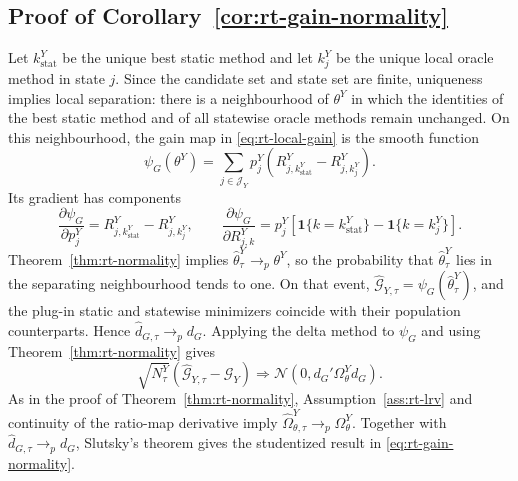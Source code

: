 \documentclass[a4paper, 12pt]{article}
\theoremstyle{plain}
\theoremstyle{remark}
\newcommand{\1}{\mathbf{1}}
\begin{document}
\subsection*{Proof of Corollary~\ref{cor:rt-gain-normality}}
Let \(k^Y_{\mathrm{stat}}\) be the unique best static method and let \(k^Y_j\) be the unique local oracle method in state \(j\). Since the candidate set and state set are finite, uniqueness implies local separation: there is a neighbourhood of \(\theta^Y\) in which the identities of the best static method and of all statewise oracle methods remain unchanged. On this neighbourhood, the gain map in \eqref{eq:rt-local-gain} is the smooth function
\begin{equation*}
    \psi_G(\theta^Y)
    =
    \sum_{j\in\mathcal J_Y}p^Y_j
    \left(R^Y_{j,k^Y_{\mathrm{stat}}}-R^Y_{j,k^Y_j}\right).
\end{equation*}
Its gradient has components
\begin{equation*}
    \frac{\partial\psi_G}{\partial p^Y_j}
    =
    R^Y_{j,k^Y_{\mathrm{stat}}}-R^Y_{j,k^Y_j},
    \qquad
    \frac{\partial\psi_G}{\partial R^Y_{j,k}}
    =
    p^Y_j
    \left[\1\{k=k^Y_{\mathrm{stat}}\}-\1\{k=k^Y_j\}\right].
\end{equation*}
Theorem~\ref{thm:rt-normality} implies \(\widehat\theta^Y_\tau\to_p\theta^Y\), so the probability that \(\widehat\theta^Y_\tau\) lies in the separating neighbourhood tends to one. On that event, \(\widehat{\mathcal G}_{Y,\tau}=\psi_G(\widehat\theta^Y_\tau)\), and the plug-in static and statewise minimizers coincide with their population counterparts. Hence \(\widehat d_{G,\tau}\to_p d_G\). Applying the delta method to \(\psi_G\) and using Theorem~\ref{thm:rt-normality} gives
\begin{equation*}
    \sqrt{N^Y_\tau}(\widehat{\mathcal G}_{Y,\tau}-\mathcal G_Y)
    \Rightarrow
    \mathcal N(0,d_G'\Omega^Y_\theta d_G).
\end{equation*}
As in the proof of Theorem~\ref{thm:rt-normality}, Assumption~\ref{ass:rt-lrv} and continuity of the ratio-map derivative imply \(\widehat\Omega^Y_{\theta,\tau}\to_p\Omega^Y_\theta\). Together with \(\widehat d_{G,\tau}\to_p d_G\), Slutsky's theorem gives the studentized result in \eqref{eq:rt-gain-normality}.



\end{document}
